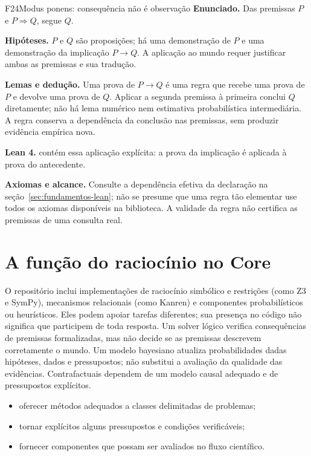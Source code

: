 \begin{formalizacao}{F24}{Modus ponens: consequência não é observação}
\textbf{Enunciado.} Das premissas $P$ e $P\Rightarrow Q$, segue $Q$.

\textbf{Hipóteses.} $P$ e $Q$ são proposições; há uma demonstração de $P$ e uma demonstração da implicação $P\to Q$. A aplicação ao mundo requer justificar ambas as premissas e sua tradução.

\textbf{Lemas e dedução.} Uma prova de $P\to Q$ é uma regra que recebe uma prova de $P$ e devolve uma prova de $Q$. Aplicar a segunda premissa à primeira conclui $Q$ diretamente; não há lema numérico nem estimativa probabilística intermediária. A regra conserva a dependência da conclusão nas premissas, sem produzir evidência empírica nova.

\textbf{Lean 4.}  contém essa aplicação explícita: a prova da implicação é aplicada à prova do antecedente.

\textbf{Axiomas e alcance.} Consulte a dependência efetiva da declaração na seção~\ref{sec:fundamentos-lean}; não se presume que uma regra tão elementar use todos os axiomas disponíveis na biblioteca. A validade da regra não certifica as premissas de uma consulta real.
\end{formalizacao}

\section{A função do raciocínio no Core}


\begin{descricao}
O repositório inclui implementações de raciocínio simbólico e restrições
(como Z3 e SymPy), mecanismos relacionais (como Kanren) e componentes
probabilísticos ou heurísticos. Eles podem apoiar tarefas diferentes; sua
presença no código não significa que participem de toda resposta. Um solver
lógico verifica consequências de premissas formalizadas, mas não decide se as
premissas descrevem corretamente o mundo. Um modelo bayesiano atualiza
probabilidades dadas hipóteses, dados e pressupostos; não substitui a avaliação
da qualidade das evidências. Contrafactuais dependem de um modelo causal
adequado e de pressupostos explícitos.
\end{descricao}

\begin{funcao}
\begin{itemize}[leftmargin=1.3em,itemsep=1pt]
  \item oferecer métodos adequados a classes delimitadas de problemas;
  \item tornar explícitos alguns pressupostos e condições verificáveis;
  \item fornecer componentes que possam ser avaliados no fluxo científico.
\end{itemize}
\end{funcao}

